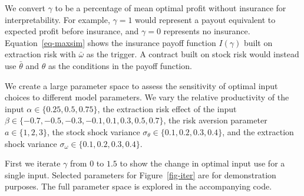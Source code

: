 \documentclass[
  letterpaper,
  DIV=11,
  numbers=noendperiod]{scrartcl}
\theoremstyle{plain}
\theoremstyle{plain}
\theoremstyle{remark}
\begin{document}
We convert \(\gamma\) to be a percentage of mean optimal profit without
insurance for interpretability. For example, \(\gamma=1\) would
represent a payout equivalent to expected profit before insurance, and
\(\gamma=0\) represents no insurance. Equation~\ref{eq-maxsim} shows the
insurance payoff function \(I(\gamma)\) built on extraction risk with
\(\bar\omega\) as the trigger. A contract built on stock risk would
instead use \(\bar\theta\) and \(\theta\) as the conditions in the
payoff function.

We create a large parameter space to assess the sensitivity of optimal
input choices to different model parameters. We vary the relative
productivity of the input \(\alpha\in\{0.25,0.5,0.75\}\), the extraction
risk effect of the input
\(\beta\in\{-0.7,-0.5,-0.3,-0.1,0.1,0.3,0.5,0.7\}\), the risk aversion
parameter \(a\in\{1,2,3\}\), the stock shock variance
\(\sigma_{\theta}\in\{0.1,0.2,0.3,0.4\}\), and the extraction shock
variance \(\sigma_{\omega}\in\{0.1,0.2,0.3,0.4\}\).

First we iterate \(\gamma\) from \(0\) to \(1.5\) to show the change in
optimal input use for a single input. Selected parameters for
Figure~\ref{fig-iter} are for demonstration purposes. The full parameter
space is explored in the accompanying code.
\end{document}
